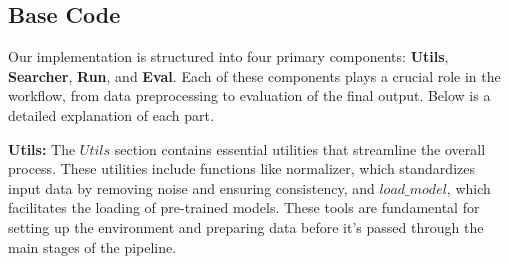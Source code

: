 \subsection{Base Code}
Our implementation is structured into four primary components: \textbf{Utils}, \textbf{Searcher}, \textbf{Run}, and \textbf{Eval}. Each of these components plays a crucial role in the workflow, from data preprocessing to evaluation of the final output. Below is a detailed explanation of each part.

\textbf{Utils:} The $Utils$ section contains essential utilities that streamline the overall process. These utilities include functions like normalizer, which standardizes input data by removing noise and ensuring consistency, and $load\_model$, which facilitates the loading of pre-trained models. These tools are fundamental for setting up the environment and preparing data before it's passed through the main stages of the pipeline.

